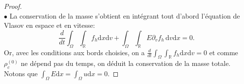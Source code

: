 \begin{proof}
  $\,$\\
%

  \noindent $\bullet$
  La conservation de la masse s'obtient en intégrant tout d'abord l'équation de Vlasov en espace et en vitesse: 
  $$
    \frac{d}{dt} \int_\Omega\int_{\mathbb{R}} f_h \mathrm{d}x \mathrm{d}v + \int_\Omega \int_{\mathbb{R}} E \partial_v f_h\,\mathrm{d}v\mathrm{d}x =0. 
  $$
  Or, avec les conditions aux bords choisies, on a  $\frac{d}{dt} \int_\Omega\int_{\mathbb{R}} f_h \mathrm{d}x \mathrm{d}v=0$ et comme $\rho^{(0)}_c$ ne dépend pas du temps, on déduit la conservation de la masse totale. Notons que $\int_\Omega E \mathrm{d}x = \int_\Omega u \mathrm{d}x = 0$. 

  \medskip 


\end{proof}
